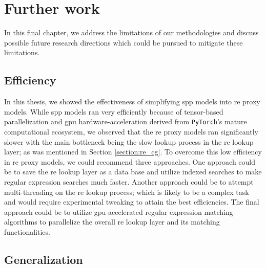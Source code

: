 \chapter{Further work}

\label{chapter:further_work}

In this final chapter, we address the limitations of our methodologies and
discuss possible future research directions which could be pursued to mitigate
these limitations.

\section{Efficiency}

In this thesis, we showed the effectiveness of simplifying \ac{spp} models into \ac{re}
proxy models. While \ac{spp} models ran very efficiently because of tensor-based
parallelization and \ac{gpu} hardware-acceleration derived from \texttt{PyTorch}'s
mature computational ecosystem, we observed that the \ac{re} proxy models ran
significantly slower with the main bottleneck being the slow lookup process in
the \ac{re} lookup layer; as was mentioned in Section \ref{section:re_cg}. To
overcome this low efficiency in \ac{re} proxy models, we could recommend three
approaches. One approach could be to save the \ac{re} lookup layer as a data base and
utilize indexed searches to make regular expression searches much
faster. Another approach could be to attempt multi-threading on the \ac{re}
lookup process; which is likely to be a complex task and would require
experimental tweaking to attain the best efficiencies. The final approach could
be to utilize \ac{gpu}-accelerated regular expression matching algorithms
\citep{wang2011gregex,zu2012gpu,yu2013gpu} to parallelize the overall \ac{re} lookup
layer and its matching functionalities.

\section{Generalization}

